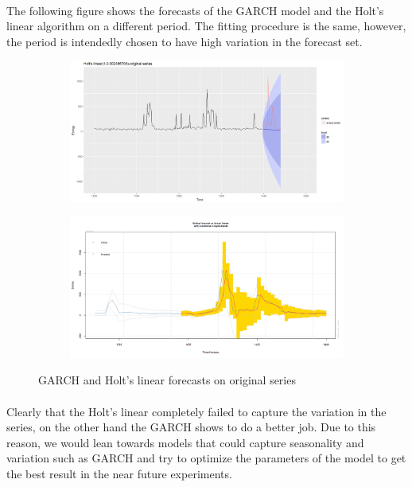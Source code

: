 \documentclass[12pt]{article}
\begin{document}
\paragraph{}
The following figure shows the forecasts of the GARCH model and the Holt's linear algorithm on a different period. The fitting procedure is the same, however, the period is intendedly chosen to have high variation in the forecast set.  
\begin{figure}[H]
  \centering
  \begin{subfigure}[b]{1\linewidth}
    \includegraphics[width=\linewidth]{figure29-1.png}
  \end{subfigure}
  \begin{subfigure}[b]{1\linewidth}
    \includegraphics[width=\linewidth]{figure29-2.png}
  \end{subfigure}
  \caption{GARCH and Holt's linear forecasts on original series}
  \label{fig:figure30}

\end{figure}
\paragraph{}
Clearly that the Holt's linear completely failed to capture the variation in the series, on the other hand the GARCH shows to do a better job. Due to this reason, we would lean towards models that could capture seasonality and variation such as GARCH and try to optimize the parameters of the model to get the best result in the near future experiments.
\end{document}
